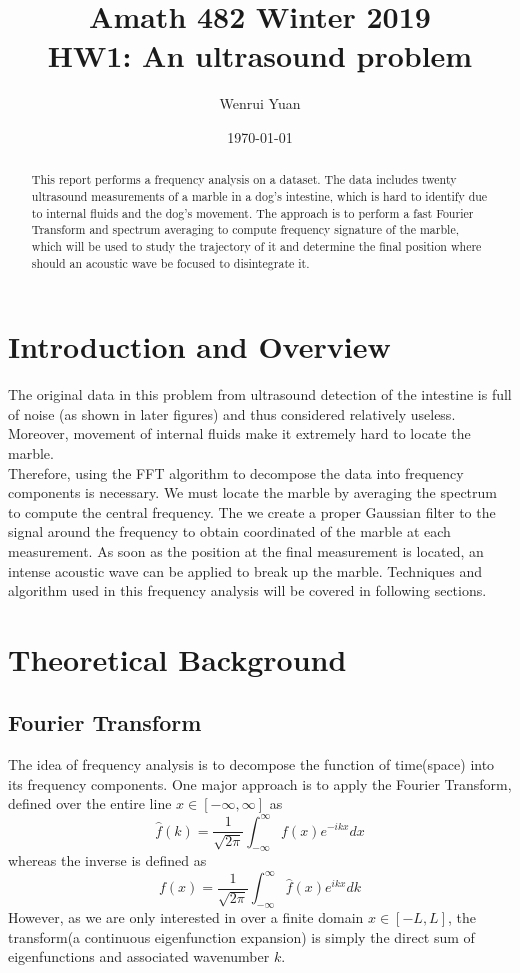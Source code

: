 \documentclass[11pt,a4paper]{article}
\title{Amath 482 Winter 2019 \\
HW1: An ultrasound problem}
\author{Wenrui Yuan}
\date{\today}
\numberwithin{equation}{subsection}
\begin{document}
\maketitle


\begin{abstract}
This report performs a frequency analysis on a dataset. The data includes twenty ultrasound measurements of a marble in a dog's intestine, which is hard to identify due to internal fluids and the dog's movement. The approach is to perform a fast Fourier Transform and spectrum averaging to compute frequency signature of the marble, which will be used to study the trajectory of it and determine the final position where should an acoustic wave be focused to disintegrate it.
\end{abstract}


\section{Introduction and Overview}
\label{sec:introduction}
The original data in this problem from ultrasound detection of the intestine is full of noise (as shown in later figures) and thus considered relatively useless. Moreover,  movement of internal fluids make it extremely hard to locate the marble.
\\Therefore, using the FFT algorithm to decompose the data into frequency components is necessary. We must locate the marble by averaging the spectrum to compute the central frequency. The we create a proper Gaussian filter to the signal around the frequency to obtain coordinated of the marble at each measurement. As soon as the position at the final measurement is located, an intense acoustic wave can be applied to break up the marble. Techniques and algorithm used in this frequency analysis will be covered in following sections.



\section{Theoretical Background}
\label{sec:theory}

	\subsection{Fourier Transform}
	The idea of frequency analysis is to decompose the function of time(space) into its frequency components. One major approach is to apply the Fourier Transform, defined over the entire line $x \in [-\infty, \infty]$ as \cite{582notes}
		\begin{equation}
		\hat{f}(k)=\frac{1}{\sqrt{2\pi}}\int_{-\infty}^{\infty} f(x)e^{-ikx}dx
		\end{equation}
		whereas the inverse is defined as \cite{582notes}
		\begin{equation}
		f(x)=\frac{1}{\sqrt{2\pi}}\int_{-\infty}^{\infty}\hat{f}(x)e^{ikx}dk
		\end{equation}
	However, as we are only interested in over a finite domain $x \in [-L, L]$, the transform(a continuous eigenfunction expansion) is simply the direct sum of eigenfunctions and associated wavenumber $k$.\cite{582notes}
	
\end{document}
